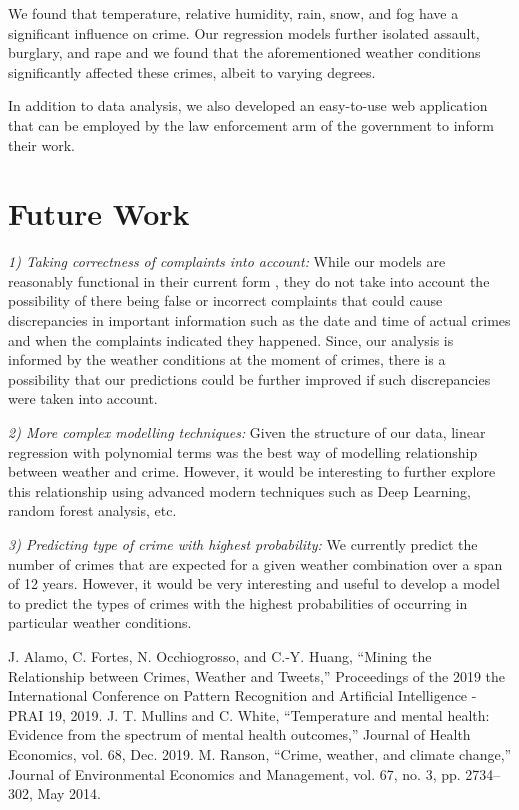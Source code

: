 \documentclass[conference]{IEEEtran}
\begin{document}
We found that temperature, relative humidity, rain, snow, and fog have a significant influence on crime.
Our regression models further isolated assault, burglary, and rape and we found that the aforementioned weather conditions significantly affected these crimes, albeit to varying degrees.

In addition to data analysis, we also developed an easy-to-use web application that can be employed by the law enforcement arm of the government to inform their work.

\section{Future Work}
\textit{1) Taking correctness of complaints into account:} While our models are reasonably functional in their current form , they do not take into account the possibility of there being false or incorrect complaints that could cause discrepancies in important information such as the date and time of actual crimes and when the complaints indicated they happened.
Since, our analysis is informed by the weather conditions at the moment of crimes, there is a possibility that our predictions could be further improved if such discrepancies were taken into account.

\textit{2) More complex modelling techniques:} Given the structure of our data, linear regression with polynomial terms was the best way of modelling relationship between weather and crime.
However, it would be interesting to further explore this relationship using advanced modern techniques such as Deep Learning, random forest analysis, etc.

\textit{3) Predicting type of crime with highest probability:} We currently predict the number of crimes that are expected for a given weather combination over a span of 12 years.
However, it would be very interesting and useful to develop a model to predict the types of crimes with the highest probabilities of occurring in particular weather conditions.

\begin{thebibliography}{00}
J. Alamo, C. Fortes, N. Occhiogrosso, and C.-Y. Huang, “Mining the Relationship between Crimes, Weather and Tweets,” Proceedings of the 2019 the International Conference on Pattern Recognition and Artificial Intelligence - PRAI 19, 2019.
J. T. Mullins and C. White, “Temperature and mental health: Evidence from the spectrum of mental health outcomes,” Journal of Health Economics, vol. 68, Dec. 2019.
M. Ranson, “Crime, weather, and climate change,” Journal of Environmental Economics and Management, vol. 67, no. 3, pp. 2734–302, May 2014.
\end{thebibliography}
\end{document}
